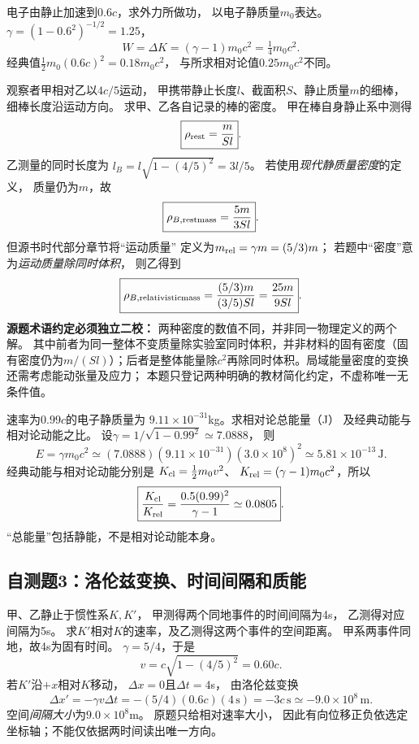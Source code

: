 \problemtext 电子由静止加速到$0.6c$，求外力所做功，
以电子静质量$m_0$表达。
\workings
$\gamma=(1-0.6^2)^{-1/2}=1.25$，
\[
\boxed{W=\Delta K=(\gamma-1)m_0c^2
=\tfrac14m_0c^2}.
\]
\crosscheck 经典值$\tfrac12 m_0(0.6c)^2=0.18m_0c^2$，
与所求相对论值$0.25m_0c^2$不同。

\problemtext 观察者甲相对乙以$4c/5$运动，
甲携带静止长度$l$、截面积$S$、静止质量$m$的细棒，
细棒长度沿运动方向。
求甲、乙各自记录的棒的密度。
\workings
甲在棒自身静止系中测得
\[
\boxed{\rho_{\rm rest}=\frac{m}{Sl}}.
\]
乙测量的同时长度为
$l_B=l\sqrt{1-(4/5)^2}=3l/5$。
若使用\emph{现代静质量密度}的定义，
质量仍为$m$，故
\[
\boxed{\rho_{B,\rm restmass}=\frac{5m}{3Sl}}.
\]
但源书时代部分章节将“运动质量”
定义为$m_{\rm rel}=\gamma m=(5/3)m$；
若题中“密度”意为\emph{运动质量除同时体积}，
则乙得到
\[
\boxed{\rho_{B,\rm relativisticmass}
=\frac{(5/3)m}{(3/5)Sl}=\frac{25m}{9Sl}}.
\]
\crosscheck \textbf{源题术语约定必须独立二校：}
两种密度的数值不同，并非同一物理定义的两个解。
其中前者为同一整体不变质量除实验室同时体积，并非材料的固有密度（固有密度仍为$m/(Sl)$）；后者是整体能量除$c^2$再除同时体积。局域能量密度的变换还需考虑能动张量及应力；
本题只登记两种明确的教材简化约定，不虚称唯一无条件值。

\problemtext 速率为$0.99c$的电子静质量为
$9.11\times10^{-31}$kg。求相对论总能量（J）
及经典动能与相对论动能之比。
\workings
设$\gamma=1/\sqrt{1-0.99^2}\simeq7.0888$，
则
\[
\boxed{E=\gamma m_0c^2
\simeq(7.0888)(9.11\times10^{-31})(3.0\times10^8)^2
\simeq5.81\times10^{-13}\,\mathrm J}.
\]
经典动能与相对论动能分别是
$K_{\rm cl}=\tfrac12m_0v^2$、
$K_{\rm rel}=(\gamma-1)m_0c^2$，所以
\[
\boxed{\frac{K_{\rm cl}}{K_{\rm rel}}
=\frac{0.5(0.99)^2}{\gamma-1}
\simeq0.0805}.
\]
\crosscheck “总能量”包括静能，不是相对论动能本身。

\subsection{自测题3：洛伦兹变换、时间间隔和质能}

\problemtext 甲、乙静止于惯性系$K,K'$，
甲测得两个同地事件的时间间隔为4s，
乙测得对应间隔为5s。
求$K'$相对$K$的速率，及乙测得这两个事件的空间距离。
\workings
甲系两事件同地，故4s为固有时间。
$\gamma=5/4$，于是
\[
\boxed{v=c\sqrt{1-(4/5)^2}=0.60c}.
\]
若$K'$沿$+x$相对$K$移动，
$\Delta x=0$且$\Delta t=4$s，
由洛伦兹变换
\[
\boxed{\Delta x'=-\gamma v\Delta t
=-(5/4)(0.6c)(4\,\mathrm s)
=-3c\,\mathrm s\simeq-9.0\times10^8\,\mathrm m}.
\]
空间\emph{间隔大小}为$9.0\times10^8$m。
\crosscheck 原题只给相对速率大小，
因此有向位移正负依选定坐标轴；不能仅依据两时间读出唯一方向。

